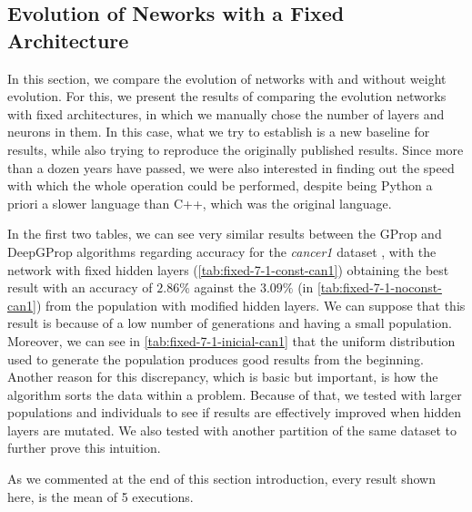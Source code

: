 \documentclass[runningheads]{llncs}
\begin{document}
\subsection{Evolution of Neworks with a Fixed Architecture}

In this section, we compare the evolution of networks with and without weight
evolution. For this, we present the results of comparing the evolution networks
with fixed architectures, in which we manually chose the number of layers and
neurons in them. In this case, what we try to establish is a new
baseline for results, while also trying to reproduce the originally
published results. Since more than a dozen years have passed, we were
also interested in finding out the speed with which the whole
operation could be performed, despite being Python a priori a slower
language than C++, which was the original language.

In the first two tables, we can see very similar results between the GProp and
DeepGProp algorithms regarding accuracy for
the \emph{cancer1} dataset \cite{uci}, with the network with fixed hidden layers
(\autoref{tab:fixed-7-1-const-can1}) obtaining the best result with an accuracy
of $2.86\%$ against the $3.09\%$ (in \autoref{tab:fixed-7-1-noconst-can1}) from
the population with modified hidden layers. We can suppose that this result is
because of a low number of generations and having a small population. Moreover,
we can see in \autoref{tab:fixed-7-1-inicial-can1} that the uniform
distribution used to generate the population produces good results from the
beginning. Another reason for this discrepancy, which is basic but important, is
how the algorithm sorts the data within a problem. Because of that, we tested
with larger populations and individuals to see if results are effectively
improved when hidden layers are mutated. We also tested with another partition
of the same dataset to further prove this intuition.

As we commented at the end of this section introduction, every result shown
here, is the mean of 5 executions.
\end{document}
